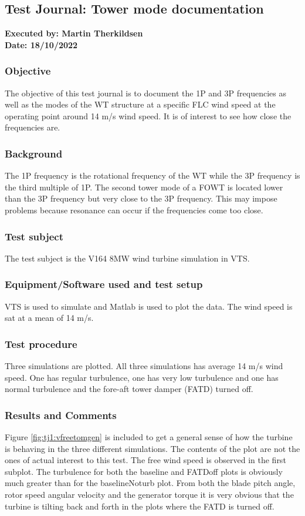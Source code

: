 \subsection{Test Journal: Tower mode documentation} \label{app:tj_01}

\textbf{Executed by: Martin Therkildsen} \\
\textbf{Date: 18/10/2022}

\subsubsection*{Objective}
The objective of this test journal is to document the 1P and 3P frequencies as well as the modes of the WT structure at a specific FLC wind speed at the operating point around 14 m/s wind speed. It is of interest to see how close the frequencies are.

\subsubsection*{Background}
The 1P frequency is the rotational frequency of the WT while the 3P frequency is the third multiple of 1P. The second tower mode of a FOWT is located lower than the 3P frequency but very close to the 3P frequency. This may impose problems because resonance can occur if the frequencies come too close.

\subsubsection*{Test subject}
The test subject is the V164 8MW wind turbine simulation in VTS.

\subsubsection*{Equipment/Software used and test setup}
VTS is used to simulate and Matlab is used to plot the data. The wind speed is sat at a mean of 14 m/s.

\subsubsection*{Test procedure}
Three simulations are plotted. All three simulations has average 14 m/s wind speed. One has regular turbulence, one has very low turbulence and one has normal turbulence and the fore-aft tower damper (FATD) turned off.

\subsubsection*{Results and Comments}
Figure \cref{fig:tj1:vfreetomgen} is included to get a general sense of how the turbine is behaving in the three different simulations. The contents of the plot are not the ones of actual interest to this test. The free wind speed is observed in the first subplot. The turbulence for both the baseline and FATDoff plots is obviously much greater than for the baselineNoturb plot. From both the blade pitch angle, rotor speed angular velocity and the generator torque it is very obvious that the turbine is tilting back and forth in the plots where the FATD is turned off.

